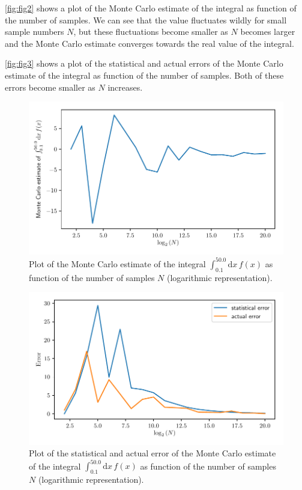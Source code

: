 \documentclass[a4paper,10pt,bibtotoc]{scrartcl}
\begin{document}
\autoref{fig:fig2} shows a plot of the Monte Carlo estimate of the integral as function of the number of samples. 
We can see that the value fluctuates wildly for small sample numbers $N$, but these fluctuations become smaller as $N$ becomes larger and the Monte Carlo estimate converges towards the real value of the integral.

\autoref{fig:fig3} shows a plot of the statistical and actual errors of the Monte Carlo estimate of the integral as function of the number of samples. 
Both of these errors become smaller as $N$ increases.

\begin{figure}
	\centering
	\includegraphics[width=\linewidth]{integral_f.pdf}
	\caption{Plot of the Monte Carlo estimate of the integral $\int_{0.1}^{50.0}\mathrm{d}x\,f(x)$ as function of the number of samples $N$ (logarithmic representation).}
	\label{fig:fig2}
\end{figure}

\begin{figure}
	\centering
	\includegraphics[width=\linewidth]{error_integral.pdf}
	\caption{Plot of the statistical and actual error of the Monte Carlo estimate of the integral $\int_{0.1}^{50.0}\mathrm{d}x\,f(x)$ as function of the number of samples $N$ (logarithmic representation).}
	\label{fig:fig3}
\end{figure}
\end{document}
